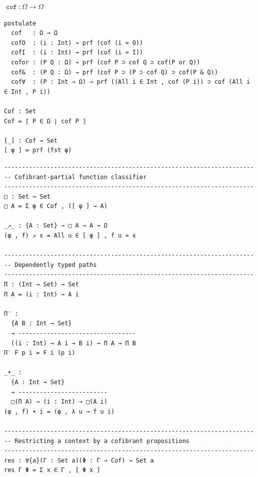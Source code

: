 \documentclass[aspectratio=169,xcolor=dvipsnames]{beamer}
\DeclareMathOperator\cof{\mathtt{cof}}
\begin{document}
\begin{frame}[fragile]{$\cof:\Omega\to\Omega$}
  \begin{verbatim}
postulate
  cof   : Ω → Ω
  cofO  : (i : Int) → prf (cof (i ≈ O))
  cofI  : (i : Int) → prf (cof (i ≈ I))
  cofor : (P Q : Ω) → prf (cof P ⊃ cof Q ⊃ cof(P or Q))
  cof&  : (P Q : Ω) → prf (cof P ⊃ (P ⊃ cof Q) ⊃ cof(P & Q))
  cof∀  : (P : Int → Ω) → prf ((All i ∈ Int , cof (P i)) ⊃ cof (All i ∈ Int , P i))

Cof : Set
Cof = ⟦ P ∈ Ω ∣ cof P ⟧

[_] : Cof → Set
[ φ ] = prf (fst φ)

  \end{verbatim}
\end{frame}

\begin{frame}{}
\begin{verbatim}
----------------------------------------------------------------------
-- Cofibrant-partial function classifier
----------------------------------------------------------------------
□ : Set → Set
□ A = Σ φ ∈ Cof , ([ φ ] → A)

_↗_ : {A : Set} → □ A → A → Ω
(φ , f) ↗ x = All u ∈ [ φ ] , f u ≈ x

----------------------------------------------------------------------
-- Dependently typed paths
----------------------------------------------------------------------
Π : (Int → Set) → Set
Π A = (i : Int) → A i

Π′ :
  {A B : Int → Set}
  → ---------------------------------
  ((i : Int) → A i → B i) → Π A → Π B
Π′ F p i = F i (p i)

_∙_ :
  {A : Int → Set}
  → -------------------------
  □(Π A) → (i : Int) → □(A i)
(φ , f) ∙ i = (φ , λ u → f u i)

----------------------------------------------------------------------
-- Restricting a context by a cofibrant propositions
----------------------------------------------------------------------
res : ∀{a}(Γ : Set a)(Φ : Γ → Cof) → Set a
res Γ Φ = Σ x ∈ Γ , [ Φ x ]

\end{verbatim}
\end{frame}
\end{document}
